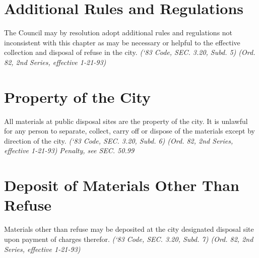 \documentclass[code.tex]{subfiles}
\begin{document}
\section{Additional Rules and Regulations}
The Council may by resolution adopt additional rules and regulations not inconsistent with this chapter as may be necessary or helpful to the effective collection and disposal of refuse in the city.\newline
\emph{(‘83 Code, SEC. 3.20, Subd. 5) (Ord. 82, 2nd Series, effective 1-21-93)}
\section{Property of the City}
All materials at public disposal sites are the property of the city.  It is unlawful for any person to separate, collect, carry off or dispose of the materials except by direction of the city.\newline
\emph{(‘83 Code, SEC. 3.20, Subd. 6) (Ord. 82, 2nd Series, effective 1-21-93)}\newline
\emph{Penalty, see SEC. 50.99}
\section{Deposit of Materials Other Than Refuse}
Materials other than refuse may be deposited at the city designated disposal site upon payment of charges therefor.\newline
\emph{(‘83 Code, SEC. 3.20, Subd. 7) (Ord. 82, 2nd Series, effective 1-21-93)}
\end{document}
